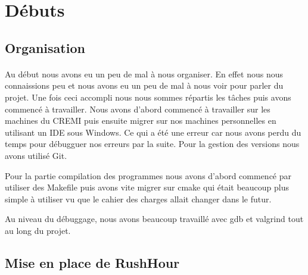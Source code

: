\documentclass[20pt]{article}
\author{Emilio Abril, Raphaël Anquetil, Benjamin Camblor, Brian Lebreton}
\date{\today}
\begin{document}
\maketitle

\newpage
\tableofcontents
\newpage

\section{Débuts}
\subsection{Organisation}
\paragraph{}
Au début nous avons eu un peu de mal à nous organiser. En effet nous nous connaissions peu et nous avons eu un peu de mal à nous voir pour parler du projet. Une fois ceci accompli nous nous sommes répartis les tâches puis avons commencé à travailler. Nous avons d'abord commencé à travailler sur les machines du CREMI puis ensuite migrer sur nos machines personnelles en utilisant un IDE sous Windows. Ce qui a été une erreur car nous avons perdu du temps pour débugguer nos erreurs par la suite. Pour la gestion des versions nous avons utilisé Git.

Pour la partie compilation des programmes nous avons d'abord commencé par utiliser des Makefile puis avons vite migrer sur cmake qui était beaucoup plus simple à utiliser vu que le cahier des charges allait changer dans le futur. 

Au niveau du débuggage, nous avons beaucoup travaillé avec gdb et valgrind tout au long du projet.

\subsection{Mise en place de RushHour}
\paragraph{}
\end{document}
